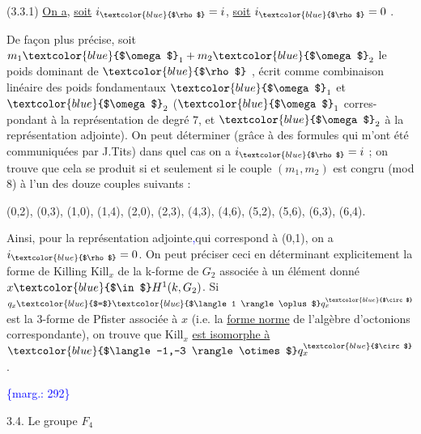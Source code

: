 \documentclass[11pt]{article}
\newcommand{\scanpage}[1]{\par\bigskip\noindent{\small\sffamily[scan #1]}\par}
\newcommand{\mspage}[1]{{\small\sffamily[p.\,#1]}}
\newcommand{\hand}[1]{\textcolor{blue}{#1}}
\newcommand{\margin}[1]{\textcolor{blue}{\{\textsf{marg.:} #1\}}}
\newcommand{\uline}[1]{\underline{#1}}
\begin{document}
(3.3.1) \uline{On a}, \uline{soit} $i_{\hand{$\rho$}} = i$, \uline{soit} $i_{\hand{$\rho$}} = 0$ .

De façon plus précise, soit $m_1\hand{$\omega$}_1 + m_2\hand{$\omega$}_2$ le poids dominant de $\hand{$\rho$}$ , écrit
comme combinaison linéaire des poids fondamentaux $\hand{$\omega$}_1$ et $\hand{$\omega$}_2$ ($\hand{$\omega$}_1$ corres-%
pondant à la représentation de degré $7$, et $\hand{$\omega$}_2$ à la représentation adjointe).
On peut déterminer (grâce à des formules qui m'ont été communiquées par
J.Tits) dans quel cas on a $i_{\hand{$\rho$}} = i$ ; on trouve que cela se produit si
et seulement si le couple $(m_1, m_2)$ est congru (mod 8) à l'un des douze
couples suivants :

(0,2), (0,3), (1,0), (1,4), (2,0), (2,3), (4,3), (4,6), (5,2), (5,6),
(6,3), (6,4).

Ainsi, pour la représentation adjointe\hand{,}qui correspond à (0,1), on
a $i_{\hand{$\rho$}} = 0$. On peut préciser ceci en déterminant explicitement la forme
de Killing $\mathrm{Kill}_x$ de la k-forme de $G_2$ associée à un élément donné
$x \hand{$\in$} H^1(k, G_2)$. Si $q_x \hand{$=$} \hand{$\langle 1 \rangle \oplus$} q_x^{\hand{$\circ$}}$ est la 3-forme de Pfister associée à $x$
(i.e. la \uline{forme norme} de l'algèbre d'octonions correspondante), on trouve
que $\mathrm{Kill}_x$ \uline{est isomorphe à} $\hand{$\langle -1,-3 \rangle \otimes$} q_x^{\hand{$\circ$}}$ .

\margin{292}

\clearpage
\scanpage{119/293}
\mspage{- 6 -}

3.4. Le groupe $F_4$
\end{document}
